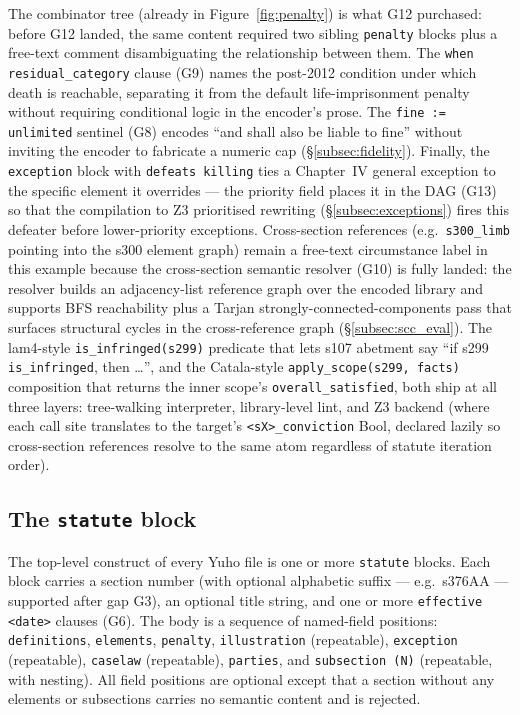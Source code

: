 The combinator tree (already in Figure~\ref{fig:penalty}) is what
\textsf{G12} purchased: before \textsf{G12} landed, the same content
required two sibling \texttt{penalty} blocks plus a free-text comment
disambiguating the relationship between them. The \texttt{when
residual\_category} clause (\textsf{G9}) names the post-2012 condition
under which death is reachable, separating it from the default
life-imprisonment penalty without requiring conditional logic in the
encoder's prose. The \texttt{fine := unlimited} sentinel (\textsf{G8})
encodes ``and shall also be liable to fine'' without inviting the
encoder to fabricate a numeric cap (\S\ref{subsec:fidelity}). Finally,
the \texttt{exception} block with \texttt{defeats killing} ties a
Chapter~IV general exception to the specific element it overrides ---
the priority field places it in the DAG (\textsf{G13}) so that the
compilation to Z3 prioritised rewriting (\S\ref{subsec:exceptions})
fires this defeater before lower-priority exceptions. Cross-section
references (e.g.\ \texttt{s300\_limb} pointing into the s300 element
graph) remain a free-text circumstance label in this example because
the cross-section semantic resolver (\textsf{G10}) is fully landed:
the resolver builds an adjacency-list reference graph over the encoded
library and supports BFS reachability plus a Tarjan
strongly-connected-components pass that surfaces structural cycles in
the cross-reference graph (\S\ref{subsec:scc_eval}). The lam4-style
\texttt{is\_infringed(s299)} predicate that lets \textsf{s107} abetment
say ``if \textsf{s299} \texttt{is\_infringed}, then \dots'', and the
Catala-style \texttt{apply\_scope(s299, facts)} composition that
returns the inner scope's \texttt{overall\_satisfied}, both ship at
all three layers: tree-walking interpreter, library-level lint, and
Z3 backend (where each call site translates to the target's
\texttt{<sX>\_conviction} Bool, declared lazily so cross-section
references resolve to the same atom regardless of statute iteration
order).

\subsection{The \texttt{statute} block}
\label{subsec:statute}
The top-level construct of every Yuho file is one or more \texttt{statute}
blocks. Each block carries a section number (with optional alphabetic
suffix --- e.g.\ s376AA --- supported after gap \textsf{G3}), an optional
title string, and one or more \texttt{effective <date>} clauses
(\textsf{G6}). The body is a sequence of named-field positions:
\texttt{definitions}, \texttt{elements}, \texttt{penalty}, \texttt{illustration}
(repeatable), \texttt{exception} (repeatable), \texttt{caselaw} (repeatable),
\texttt{parties}, and \texttt{subsection (N)} (repeatable, with
nesting). All field positions are optional except that a section without
any elements or subsections carries no semantic content and is rejected.

